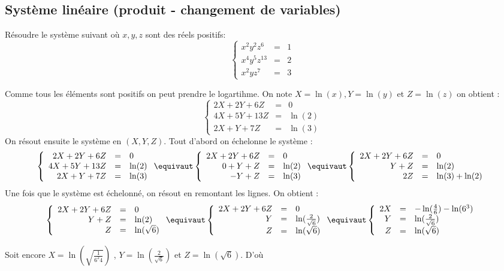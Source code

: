 \subsection{Système linéaire (produit - changement de variables)}

\begin{exercice}
Résoudre le système suivant où $x,y,z$ sont des réels positifs: 
$$\left\{ \begin{array}{ccc}
x^2y^2z^6 & =& 1\\
x^4y^5z^{13}& =& 2 \\
x^2yz^7 & =& 3
\end{array}\right. $$
\end{exercice}

\begin{correction}
Comme tous les éléments sont positifs on peut prendre le logartihme. 
On note $X= \ln(x), Y=\ln(y)$ et $Z=\ln(z)$ on obtient : 
$$\left\{ \begin{array}{ccc}
2X +2Y+6Z& =& 0\\
4X+5Y+13Z& =& \ln(2) \\
2X+Y+7Z & =& \ln(3)
\end{array}\right. $$
On résout ensuite le système en $(X,Y,Z)$. Tout d'abord on échelonne le système : 
$$\left\{ \begin{array}{rcl}
2X +2Y+6Z& =& 0\\
4X+5Y+13Z& =& \ln(2) \\
2X+Y+7Z & =& \ln(3)
\end{array}\right. \equivaut 
\left\{ \begin{array}{rcl}
2X +2Y+6Z& =& 0\\
0+Y+Z& =& \ln(2) \\
-Y+Z & =& \ln(3)
\end{array}\right. \equivaut 
\left\{ \begin{array}{rcl}
2X +2Y+6Z& =& 0\\
Y+Z& =& \ln(2) \\
2 Z & =& \ln(3) +\ln(2)
\end{array}\right.$$
Une fois que le système est échelonné, on résout en remontant les lignes. 
On obtient : 
$$\left\{ \begin{array}{rcl}
2X +2Y+6Z& =& 0\\
Y+Z& =& \ln(2) \\
Z & =& \ln(\sqrt{6})
\end{array}\right. \equivaut 
\left\{ \begin{array}{rcl}
2X +2Y+6Z& =& 0\\
Y& =& \ln(\frac{2}{\sqrt{6}}) \\
Z & =& \ln(\sqrt{6})
\end{array}\right. \equivaut 
\left\{ \begin{array}{rcl}
2X & =& -\ln(\frac{4}{6})  -\ln(6^3)\\
Y& =& \ln(\frac{2}{\sqrt{6}}) \\
Z & =& \ln(\sqrt{6})
\end{array}\right.
$$


Soit encore  $X= \ln( \sqrt{\frac{1}{6^2 4}}) $ , $Y = \ln(\frac{2}{\sqrt{6}}) $ et $Z= \ln(\sqrt{6})$. 
D'où 

\end{correction}